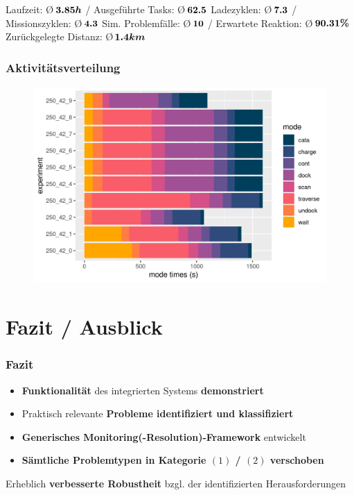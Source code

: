 \documentclass{beamer}
\begin{document}
\begin{frame}
\begin{figure}[H]
\begin{subfigure}[b]{0.49\textwidth}
    \end{subfigure}
  \end{figure}
  \centering
  Laufzeit: \O $\thinspace \boldsymbol{3.85 h}$ / Ausgeführte Tasks: \O $\thinspace \boldsymbol{62.5}$\linebreak
  \centering
  Ladezyklen: \O $\thinspace \boldsymbol{7.3}$ / Missionszyklen: \O $\thinspace \boldsymbol{4.3}$\linebreak
  \centering
  Sim. Problemfälle: \O $\thinspace \boldsymbol{10}$ / Erwartete Reaktion: \O $\thinspace \boldsymbol{90.31 \%}$\linebreak
  \centering
  Zurückgelegte Distanz: \O $\thinspace \boldsymbol{1.4 km}$
\end{frame}

\begin{frame}
  \frametitle{Aktivitätsverteilung}
  \begin{figure}[H]
    \centering
    \includegraphics[width=\textwidth]{img/mode_times.png}
  \end{figure}
\end{frame}

\section{Fazit / Ausblick}

\begin{frame}
  \frametitle{Fazit}
  \begin{itemize}
    \item \textbf{Funktionalität} des integrierten Systems \textbf{demonstriert}
    \item Praktisch relevante \textbf{Probleme identifiziert und klassifiziert}
    \item \textbf{Generisches Monitoring(-Resolution)-Framework} entwickelt
    \item \textbf{Sämtliche Problemtypen in Kategorie $(1)$ / $(2)$ verschoben}
  \end{itemize}
  \textrightarrow \thinspace Erheblich \textbf{verbesserte Robustheit} bzgl. der identifizierten Herausforderungen
\end{frame}
\end{document}
